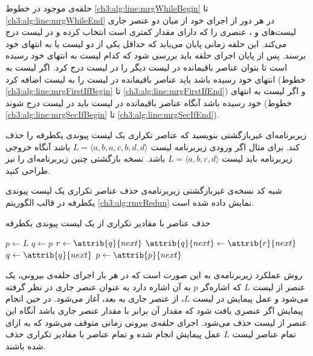 حلقه‌ی {} موجود در خطوط {\ref{ch3:alg:line:mrgWhileBegin}} تا {\ref{ch3:alg:line:mrgWhileEnd}} در هر دور از اجرای خود از میان دو عنصر جاری لیست‌های {} و {}، عنصری را که دارای مقدار کمتری است انتخاب کرده و در لیست {} درج می‌کند. این حلقه زمانی پایان می‌یابد که حداقل یکی از دو لیست {} یا {} به انتهای خود برسند. پس از پایان اجرای حلقه باید بررسی شود که کدام لیست به انتهای خود رسیده است تا بتوان عناصر باقیمانده در لیست دیگر را در لیست {} درج کرد. اگر لیست {} به انتهای خود رسیده باشد باید عناصر باقیمانده در لیست {} را به لیست {} اضافه کرد (خطوط {\ref{ch3:alg:line:mrgFirstIfBegin}} تا {\ref{ch3:alg:line:mrgFirstIfEnd}}) و اگر لیست {} به انتهای خود رسیده باشد آنگاه عناصر باقیمانده در لیست {} باید در لیست {} درج شوند (خطوط {\ref{ch3:alg:line:mrgSecIfBegin}} تا {\ref{ch3:alg:line:mrgSecIfEnd}}).

 زیربرنامه‌ای غیربازگشتی بنویسید که عناصر تکراری یک لیست پیوندی یکطرفه را حذف کند. برای مثال اگر ورودی زیربرنامه لیست {$L=\langle a,b,a,c,b,d,d\rangle$} باشد آنگاه خروجی زیربرنامه باید لیست {$L=\langle a,b,c,d\rangle$} باشد. نسخه بازگشتی چنین زیربرنامه‌ای  را نیز طراحی کنید.


شبه کد نسخه‌ی غیربازگشتی زیربرنامه‌ی حذف عناصر تکراری یک لیست پیوندی یکطرفه در قالب الگوریتم {\eqref{ch3:alg:rmvRedun}} نمایش داده شده است.
\begin{algorithm}
\caption{حذف عناصر با مقادیر تکراری از یک لیست پیوندی یکطرفه}\label{ch3:alg:rmvRedun}
\begin{latin}
\begin{algorithmic}[1]
				\State	\Return
		\EndIf
		\State	$p \gets L$
				\State	$q \gets p$
								\State	$r \gets \attrib{q}{next}$
								\State	$\attrib{q}{next} \gets \attrib{r}{next}$
								\State	{}
						\Else
								\State	$q \gets \attrib{q}{next}$
						\EndIf
				\EndWhile
				\State	$p \gets \attrib{p}{next}$
		\EndWhile		
\EndProcedure
\end{algorithmic}
\end{latin}
\end{algorithm}

روش عملکرد زیربرنامه‌ی {} به این صورت است که در هر بار اجرای حلقه‌ی {} بیرونی، یک عنصر از لیست {$L$} که اشاره‌گر {$p$} به آن اشاره دارد به عنوان عنصر جاری در نظر گرفته می‌شود و عمل پیمایش در لیست {$L$}، از عنصر جاری به بعد، آغاز می‌شود. در حین انجام پیمایش اگر عنصری یافت شود که مقدار آن برابر با مقدار عنصر جاری باشد آنگاه این عنصر از لیست حذف می‌شود. اجرای حلقه‌ی {} بیرونی زمانی متوقف می‌شود که به ازای تمام عناصر لیست {$L$} عمل پیمایش انجام شده و تمام عناصر با مقادیر تکراری حذف شده باشند.


